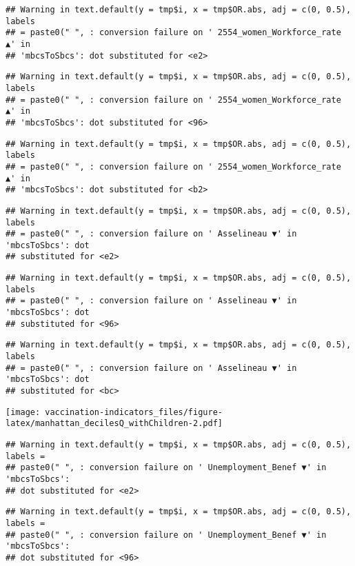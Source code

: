 \documentclass[
]{article}
\begin{document}
\begin{verbatim}
## Warning in text.default(y = tmp$i, x = tmp$OR.abs, adj = c(0, 0.5), labels
## = paste0(" ", : conversion failure on ' 2554_women_Workforce_rate ▲' in
## 'mbcsToSbcs': dot substituted for <e2>
\end{verbatim}

\begin{verbatim}
## Warning in text.default(y = tmp$i, x = tmp$OR.abs, adj = c(0, 0.5), labels
## = paste0(" ", : conversion failure on ' 2554_women_Workforce_rate ▲' in
## 'mbcsToSbcs': dot substituted for <96>
\end{verbatim}

\begin{verbatim}
## Warning in text.default(y = tmp$i, x = tmp$OR.abs, adj = c(0, 0.5), labels
## = paste0(" ", : conversion failure on ' 2554_women_Workforce_rate ▲' in
## 'mbcsToSbcs': dot substituted for <b2>
\end{verbatim}

\begin{verbatim}
## Warning in text.default(y = tmp$i, x = tmp$OR.abs, adj = c(0, 0.5), labels
## = paste0(" ", : conversion failure on ' Asselineau ▼' in 'mbcsToSbcs': dot
## substituted for <e2>
\end{verbatim}

\begin{verbatim}
## Warning in text.default(y = tmp$i, x = tmp$OR.abs, adj = c(0, 0.5), labels
## = paste0(" ", : conversion failure on ' Asselineau ▼' in 'mbcsToSbcs': dot
## substituted for <96>
\end{verbatim}

\begin{verbatim}
## Warning in text.default(y = tmp$i, x = tmp$OR.abs, adj = c(0, 0.5), labels
## = paste0(" ", : conversion failure on ' Asselineau ▼' in 'mbcsToSbcs': dot
## substituted for <bc>
\end{verbatim}

\texttt{[image: vaccination-indicators\_files/figure-latex/manhattan\_decilesQ\_withChildren-2.pdf]}

\begin{verbatim}
## Warning in text.default(y = tmp$i, x = tmp$OR.abs, adj = c(0, 0.5), labels =
## paste0(" ", : conversion failure on ' Unemployment_Benef ▼' in 'mbcsToSbcs':
## dot substituted for <e2>
\end{verbatim}

\begin{verbatim}
## Warning in text.default(y = tmp$i, x = tmp$OR.abs, adj = c(0, 0.5), labels =
## paste0(" ", : conversion failure on ' Unemployment_Benef ▼' in 'mbcsToSbcs':
## dot substituted for <96>
\end{verbatim}
\end{document}
